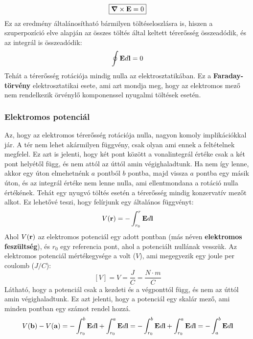 \documentclass[a4paper,12pt]{article}
\begin{document}
\begin{equation}
    \boxed{\boldsymbol{\nabla} \times \bold{E} = 0}
\end{equation}
Ez az eredmény általánosítható bármilyen töltéseloszlásra is, hiszen a szuperpozíció elve alapján az összes töltés által keltett térerősség összeadódik, és az integrál is összeadódik:
\begin{equation}
    \oint \bold{E} d\bold{l} = 0
\end{equation}
Tehát a térerősség rotációja mindig nulla az elektrosztatikában. Ez a \textbf{Faraday-törvény} elektrosztatikai esete, ami azt mondja meg, hogy az elektromos mező nem rendelkezik örvénylő komponenssel nyugalmi töltések esetén.

\subsubsection{Elektromos potenciál}
Az, hogy az elektromos térerősség rotációja nulla, nagyon komoly implikációkkal jár. A tér nem lehet akármilyen függvény, csak olyan ami ennek a feltételnek megfelel.
Ez azt is jelenti, hogy két pont között a vonalintegrál értéke csak a két pont helyétől függ, és nem attól az úttól amin végighaladtunk. Ha nem így lenne, akkor egy úton elmehetnénk $a$ pontból $b$ pontba, majd vissza $a$ pontba egy másik úton, és az integrál értéke nem lenne nulla, ami ellentmondana a rotáció nulla értékének.
Tehát egy nyugvó töltés esetén a térerősség mindig konzervatív mezőt alkot. Ez lehetővé teszi, hogy felírjunk egy általános függvényt:
\begin{equation}
    V(\bold{r}) = - \int_{r_0}^{r} \bold{E} d\bold{l}
\end{equation}
Ahol $V(\bold{r})$ az elektromos potenciál egy adott pontban (más néven \textbf{elektromos feszültség}), és $r_0$ egy referencia pont, ahol a potenciált nullának vesszük. Az elektromos potenciál mértékegysége a volt ($V$), ami megegyezik egy joule per coulomb ($J/C$):
\begin{equation}
    \left[V\right] = V = \frac{J}{C} = \frac{N \cdot m}{C}
\end{equation}
Látható, hogy a potenciál csak a kezdeti és a végponttól függ, és nem az úttól amin végighaladtunk. Ez azt jelenti, hogy a potenciál egy skalár mező, ami minden pontban egy számot rendel hozzá.
\begin{equation}
    V(\bold{b}) - V(\bold{a}) = - \int_{r_0}^{b} \bold{E} d\bold{l} + \int_{r_0}^{a} \bold{E} d\bold{l} = - \int_{r_0}^{b} \bold{E} d\bold{l} + \int_{r_0}^{a} \bold{E} d\bold{l} = - \int_{a}^{b} \bold{E} d\bold{l} 
\end{equation}
\end{document}
